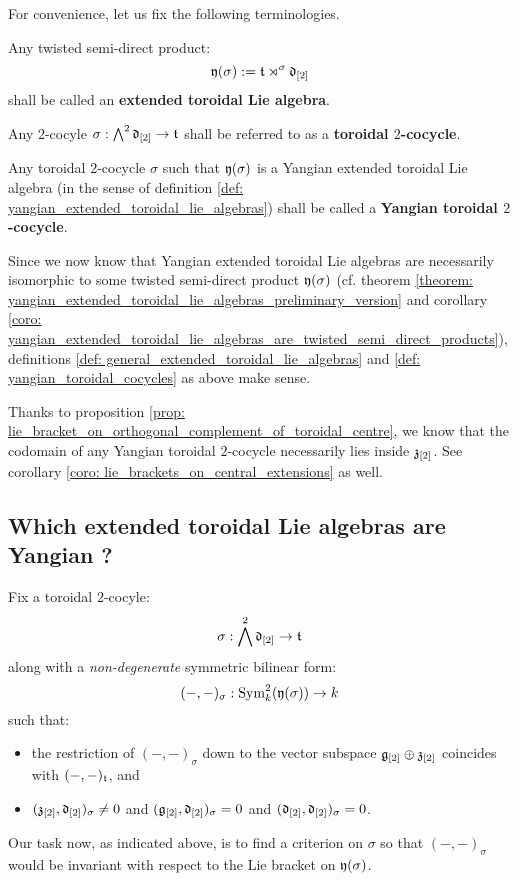         For convenience, let us fix the following terminologies.
        \begin{definition} \label{def: general_extended_toroidal_lie_algebras}
            Any twisted semi-direct product:
                $$\mathfrak{y}(\sigma) := \mathfrak{t} \rtimes^{\sigma} \mathfrak{d}_{[2]}$$
            shall be called an \textbf{extended toroidal Lie algebra}.
        \end{definition}
        \begin{definition} \label{def: yangian_toroidal_cocycles}
            Any $2$-cocyle $\sigma: \bigwedge^2 \mathfrak{d}_{[2]} \to \mathfrak{t}$ shall be referred to as a \textbf{toroidal $2$-cocycle}.
            
            Any toroidal $2$-cocycle $\sigma$ such that $\mathfrak{y}(\sigma)$ is a Yangian extended toroidal Lie algebra (in the sense of definition \ref{def: yangian_extended_toroidal_lie_algebras}) shall be called a \textbf{Yangian toroidal $2$-cocycle}.
        \end{definition}
        \begin{remark}
            Since we now know that Yangian extended toroidal Lie algebras are necessarily isomorphic to some twisted semi-direct product $\mathfrak{y}(\sigma)$ (cf. theorem \ref{theorem: yangian_extended_toroidal_lie_algebras_preliminary_version} and corollary \ref{coro: yangian_extended_toroidal_lie_algebras_are_twisted_semi_direct_products}), definitions \ref{def: general_extended_toroidal_lie_algebras} and \ref{def: yangian_toroidal_cocycles} as above make sense.
        \end{remark}
        \begin{remark}
            Thanks to proposition \ref{prop: lie_bracket_on_orthogonal_complement_of_toroidal_centre}, we know that the codomain of any Yangian toroidal $2$-cocycle necessarily lies inside $\mathfrak{z}_{[2]}$. See corollary \ref{coro: lie_brackets_on_central_extensions} as well.
        \end{remark}

    \subsection{Which extended toroidal Lie algebras are Yangian ?}
        Fix a toroidal $2$-cocyle:
            $$\sigma: \bigwedge^2 \mathfrak{d}_{[2]} \to \mathfrak{t}$$
        along with a \textit{non-degenerate} symmetric bilinear form:
            $$(-, -)_{\sigma}: \mathrm{Sym}^2_k( \mathfrak{y}(\sigma) ) \to k$$
        such that:
        \begin{itemize}
            \item the restriction of $(-, -)_{\sigma}$ down to the vector subspace $\mathfrak{g}_{[2]} \oplus \mathfrak{z}_{[2]}$ coincides with $(-, -)_{\mathfrak{t}}$, and
            \item $(\mathfrak{z}_{[2]}, \mathfrak{d}_{[2]})_{\sigma} \not = 0$ and $(\mathfrak{g}_{[2]}, \mathfrak{d}_{[2]})_{\sigma} = 0$ and $(\mathfrak{d}_{[2]}, \mathfrak{d}_{[2]})_{\sigma} = 0$.
        \end{itemize}
        Our task now, as indicated above, is to find a criterion on $\sigma$ so that $(-, -)_{\sigma}$ would be invariant with respect to the Lie bracket on $\mathfrak{y}(\sigma)$.
        
